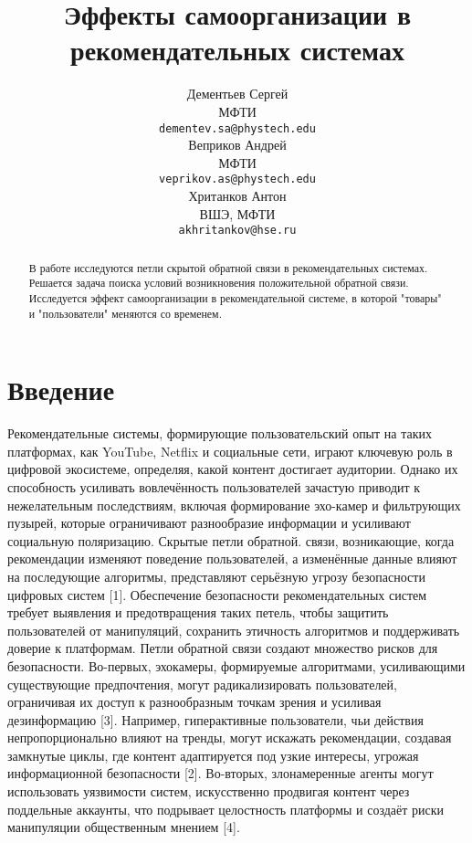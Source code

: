\documentclass{article}
\title{Эффекты самоорганизации в рекомендательных системах}
\author{ Дементьев Сергей \\
        МФТИ\\
	\texttt{dementev.sa@phystech.edu}  \\
	\And
	Веприков Андрей \\
        МФТИ \\
	\texttt{veprikov.as@phystech.edu}  \\
	\And
    Хританков Антон \\
    ВШЭ, МФТИ\\
     \texttt{akhritankov@hse.ru} \\
}
\date{}
\begin{document}
\maketitle


\begin{abstract}
    В работе исследуются петли скрытой обратной связи в рекомендательных системах.
    Решается задача поиска условий возникновения положительной обратной связи. Исследуется эффект самоорганизации в рекомендательной системе, в которой "товары" и "пользователи" меняются со временем.
\end{abstract}




\section{Введение}


Рекомендательные системы, формирующие пользовательский опыт на таких платформах, как YouTube, Netflix и социальные сети, играют ключевую роль в цифровой экосистеме, определяя, какой контент достигает аудитории. Однако их способность усиливать вовлечённость пользователей зачастую приводит к нежелательным последствиям, включая формирование эхо-камер и фильтрующих пузырей, которые ограничивают разнообразие информации и усиливают социальную поляризацию. Скрытые петли обратной. 
связи, возникающие, когда рекомендации изменяют поведение пользователей, а изменённые данные влияют на последующие алгоритмы, представляют серьёзную угрозу безопасности цифровых систем [1]. Обеспечение безопасности рекомендательных систем
требует выявления и предотвращения таких петель, чтобы защитить пользователей от
манипуляций, сохранить этичность алгоритмов и поддерживать доверие к платформам.
Петли обратной связи создают множество рисков для безопасности. Во-первых, эхокамеры, формируемые алгоритмами, усиливающими существующие предпочтения, могут радикализировать пользователей, ограничивая их доступ к разнообразным точкам
зрения и усиливая дезинформацию [3]. Например, гиперактивные пользователи, чьи действия непропорционально влияют на тренды, могут искажать рекомендации, создавая
замкнутые циклы, где контент адаптируется под узкие интересы, угрожая информационной безопасности [2]. Во-вторых, злонамеренные агенты могут использовать уязвимости систем, искусственно продвигая контент через поддельные аккаунты, что подрывает целостность платформы и создаёт риски манипуляции общественным мнением [4].
\end{document}
